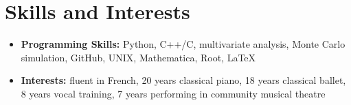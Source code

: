  \section*{Skills and Interests}
\begin{itemize}
\item \textbf{Programming Skills:} Python, C++/C, multivariate analysis, Monte Carlo simulation, GitHub, UNIX, Mathematica, Root, \LaTeX{}
\item{\textbf{Interests:} fluent in French, 20 years classical piano, 18 years classical ballet, 8 years vocal training, 7 years performing in community musical theatre}
\end{itemize}




